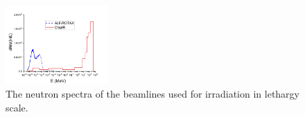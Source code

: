 %
%
%
%
%

\begin{figure}[tb]
\centering
\includegraphics[width=0.35\textwidth]{./figs/rotax-chipir}
\caption{The neutron spectra of the beamlines used for irradiation in lethargy scale.}
\label{rotax_chipir}
\end{figure}


\label{subsec_codes}

